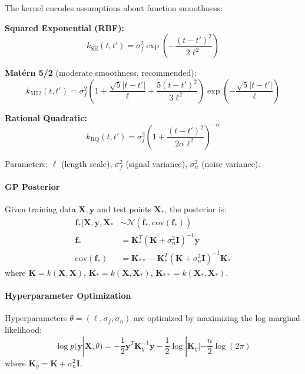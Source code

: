 The kernel encodes assumptions about function smoothness:

\textbf{Squared Exponential (RBF):}
\begin{equation}
  k_{\text{SE}}(t, t') = \sigma_f^2 \exp\left( -\frac{(t - t')^2}{2\ell^2} \right)
\end{equation}

\textbf{Mat\'ern 5/2} (moderate smoothness, recommended):
\begin{equation}
  k_{\text{M52}}(t, t') = \sigma_f^2 \left(1 + \frac{\sqrt{5}|t-t'|}{\ell} + \frac{5(t-t')^2}{3\ell^2}\right) \exp\left(-\frac{\sqrt{5}|t-t'|}{\ell}\right)
\end{equation}

\textbf{Rational Quadratic:}
\begin{equation}
  k_{\text{RQ}}(t, t') = \sigma_f^2 \left(1 + \frac{(t-t')^2}{2\alpha\ell^2}\right)^{-\alpha}
\end{equation}

Parameters: $\ell$ (length scale), $\sigma_f^2$ (signal variance), $\sigma_n^2$ (noise variance).

\paragraph{GP Posterior}

Given training data $\mathbf{X}, \mathbf{y}$ and test points $\mathbf{X}_*$, the posterior is:
\begin{align}
  \mathbf{f}_* | \mathbf{X}, \mathbf{y}, \mathbf{X}_* &\sim \mathcal{N}(\bar{\mathbf{f}}_*, \text{cov}(\mathbf{f}_*)) \\
  \bar{\mathbf{f}}_* &= \mathbf{K}_*^T (\mathbf{K} + \sigma_n^2 \mathbf{I})^{-1} \mathbf{y} \\
  \text{cov}(\mathbf{f}_*) &= \mathbf{K}_{**} - \mathbf{K}_*^T (\mathbf{K} + \sigma_n^2 \mathbf{I})^{-1} \mathbf{K}_*
\end{align}
where $\mathbf{K} = k(\mathbf{X}, \mathbf{X})$, $\mathbf{K}_* = k(\mathbf{X}, \mathbf{X}_*)$, $\mathbf{K}_{**} = k(\mathbf{X}_*, \mathbf{X}_*)$.

\paragraph{Hyperparameter Optimization}

Hyperparameters $\theta = (\ell, \sigma_f, \sigma_n)$ are optimized by maximizing the log marginal likelihood:
\begin{equation}
  \log p(\mathbf{y} | \mathbf{X}, \theta) = -\frac{1}{2}\mathbf{y}^T \mathbf{K}_y^{-1} \mathbf{y} - \frac{1}{2}\log|\mathbf{K}_y| - \frac{n}{2}\log(2\pi)
\end{equation}
where $\mathbf{K}_y = \mathbf{K} + \sigma_n^2\mathbf{I}$.

